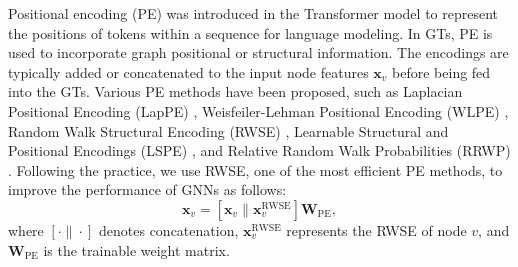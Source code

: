 Positional encoding (PE) was introduced in the Transformer model \cite{vaswani2017attention} to represent the positions of tokens within a sequence for language modeling. In GTs, PE is used to incorporate graph positional or structural information. The encodings are typically added or concatenated to the input node features $\boldsymbol{x}_v$ before being fed into the GTs. Various PE methods have been proposed, such as Laplacian Positional Encoding (LapPE) \cite{dwivedi2020generalization,kreuzer2021rethinking}, Weisfeiler-Lehman Positional Encoding (WLPE) \cite{zhang2020graph}, Random Walk Structural Encoding (RWSE) \cite{li2020distance,dwivedi2021graph,rampavsek2022recipe}, Learnable Structural and Positional Encodings (LSPE) \cite{dwivedi2021graph}, and Relative Random Walk Probabilities (RRWP) \cite{ma2023graph}. 
Following the practice, we use RWSE, one of the most efficient PE methods, to improve the performance of GNNs as follows:
\begin{equation}
\boldsymbol{x}_v = [\boldsymbol{x}_v \| \boldsymbol{x}^\text{RWSE}_v] \boldsymbol{W}_\text{PE},
\end{equation}
where \([\cdot \| \cdot]\) denotes concatenation, \(\boldsymbol{x}^\text{RWSE}_v\) represents the RWSE of node \(v\), and \(\boldsymbol{W}_\text{PE}\) is the trainable weight matrix.

